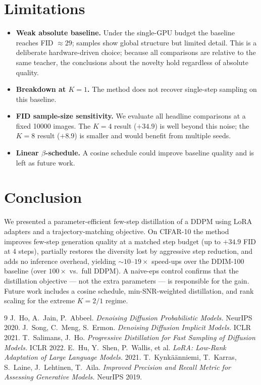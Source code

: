 \documentclass[11pt]{article}
\begin{document}
\section{Limitations}
\begin{itemize}
  \item \textbf{Weak absolute baseline.} Under the single-GPU budget the baseline reaches
        FID $\approx 29$; samples show global structure but limited detail. This is a
        deliberate hardware-driven choice; because all comparisons are relative to the same
        teacher, the conclusions about the novelty hold regardless of absolute quality.
  \item \textbf{Breakdown at $K=1$.} The method does not recover single-step sampling on this
        baseline.
  \item \textbf{FID sample-size sensitivity.} We evaluate all headline comparisons at a fixed
        \num{10000} images. The $K=4$ result ($+34.9$) is well beyond this noise; the $K=8$
        result ($+8.9$) is smaller and would benefit from multiple seeds.
  \item \textbf{Linear $\beta$-schedule.} A cosine schedule could improve baseline quality and
        is left as future work.
\end{itemize}

\section{Conclusion}
We presented a parameter-efficient few-step distillation of a DDPM using LoRA adapters and a
trajectory-matching objective. On CIFAR-10 the method improves few-step generation quality at
a matched step budget (up to $+34.9$ FID at 4 steps), partially restores the diversity lost by
aggressive step reduction, and adds no inference overhead, yielding ${\sim}10$--$19\times$
speed-ups over the DDIM-100 baseline (over $100\times$ vs.\ full DDPM). A naive-eps control
confirms that the distillation objective --- not the extra parameters --- is responsible for
the gain. Future work includes a cosine schedule, min-SNR-weighted distillation, and rank
scaling for the extreme $K=2/1$ regime.

\begin{thebibliography}{9}
 J.~Ho, A.~Jain, P.~Abbeel.
  \emph{Denoising Diffusion Probabilistic Models.} NeurIPS 2020.
 J.~Song, C.~Meng, S.~Ermon.
  \emph{Denoising Diffusion Implicit Models.} ICLR 2021.
 T.~Salimans, J.~Ho.
  \emph{Progressive Distillation for Fast Sampling of Diffusion Models.} ICLR 2022.
 E.~Hu, Y.~Shen, P.~Wallis, et al.
  \emph{LoRA: Low-Rank Adaptation of Large Language Models.} 2021.
 T.~Kynk\"a\"anniemi, T.~Karras, S.~Laine,
  J.~Lehtinen, T.~Aila. \emph{Improved Precision and Recall Metric for Assessing
  Generative Models.} NeurIPS 2019.
\end{thebibliography}
\end{document}
